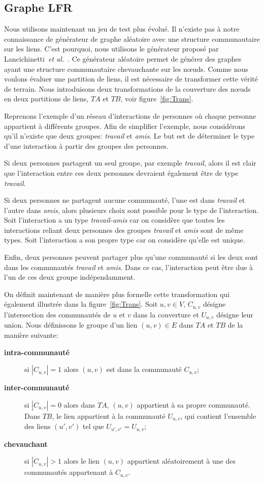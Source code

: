 \subsection{Graphe LFR}
Nous utilisons maintenant un jeu de test plus évolué.
Il n'existe pas à notre connaissance de générateur de graphe aléatoire avec une structure communautaire sur les liens.
C'est pourquoi, nous utilisons le générateur proposé par Lancichinetti~\textit{et al.}~\cite{Lancichinetti2009b}.
Ce générateur aléatoire permet de générer des graphes ayant une structure communautaire chevauchante sur les n\oe uds.
Comme nous voulons évaluer une partition de liens, il est nécessaire de transformer cette vérité de terrain.
Nous introduisons deux transformations de la couverture des n\oe uds en deux partitions de liens, $TA$ et $TB$, voir figure~\ref{fig:Trans}.


Reprenons l'exemple d'un réseau d'interactions de personnes où chaque personne appartient à différents groupes.
Afin de simplifier l'exemple, nous considérons qu'il n'existe que deux groupes: \emph{travail} et \emph{amis}.
Le but est de déterminer le type d'une interaction à partir des groupes des personnes.

Si deux personnes partagent un seul groupe, par exemple \emph{travail}, alors il est clair que l'interaction entre ces deux personnes devraient également être de type \emph{travail}.

Si deux personnes ne partagent aucune communauté, l'une est dans \emph{travail} et l'autre dans \emph{amis}, alors plusieurs choix sont possible pour le type de l'interaction.
Soit l'interaction a un type \emph{travail-amis} car on considère que toutes les interactions reliant deux personnes des groupes \emph{travail} et \emph{amis} sont de même types.
Soit l'interaction a son propre type car on considère qu'elle est unique.

Enfin, deux personnes peuvent partager plus qu'une communauté si les deux sont dans les communautés \emph{travail} et \emph{amis}.
Dans ce cas, l'interaction peut être due à l'un de ces deux groupe indépendamment.

On définit maintenant de manière plus formelle cette transformation qui également illustrée dans la figure~\ref{fig:Trans}.
Soit $u,v \in V$, $C_{u,v}$ désigne l'intersection des communautés de $u$ et $v$ dans la couverture et $U_{u,v}$ désigne leur union.
Nous définissons le groupe d'un lien $(u,v) \in E$ dans $TA$ et $TB$ de la manière suivante:
\begin{description}
\item[\textbf{intra-communauté}] si $|C_{u,v}| = 1$ alors $(u,v)$ est dans la communauté $C_{u,v}$;
\item[\textbf{inter-communauté}] si $|C_{u,v}| = 0$ alors dans $TA$, $(u,v)$ appartient à sa propre communauté.
Dans $TB$, le lien appartient à la communauté $U_{u,v}$, qui contient l'ensemble des liens $(u',v')$ tel que $U_{u',v'}=U_{u,v}$;
\item[\textbf{chevauchant}] si $|C_{u,v}| > 1$ alors le lien $(u,v)$ appartient aléatoirement à une des communautés appartenant à $C_{u,v}$.
\end{description}

